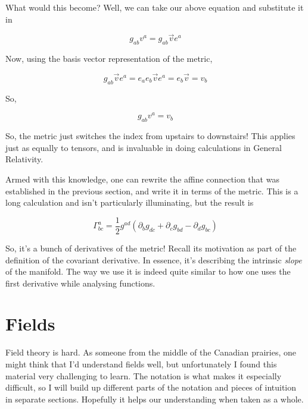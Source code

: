 \documentclass{article}
\begin{document}
What would this become? Well, we can take our above equation and substitute it in

\begin{equation}
    g_{ab} v^a = g_{ab} \vec{v} e^a
\end{equation}

Now, using the basis vector representation of the metric,

\begin{equation}
    g_{ab} \vec{v} e^a = e_a e_b \vec{v} e^a = e_b \vec{v} = v_b
\end{equation}

So,

\begin{equation}
    g_{ab} v^a = v_b
\end{equation}

So, the metric just switches the index from upstairs to downstairs! This applies just as equally to tensors, and is invaluable in doing calculations in General Relativity. 

Armed with this knowledge, one can rewrite the affine connection that was established in the previous section, and write it in terms of the metric. This is a long calculation and isn't particularly illuminating, but the result is

\begin{equation}
    \Gamma^a_{bc} = \frac{1}{2}g^{ad}(\partial_bg_{dc} + \partial_cg_{bd} - \partial_dg_{bc})
\end{equation}

So, it's a bunch of derivatives of the metric! Recall its motivation as part of the definition of the covariant derivative. In essence, it's describing the intrinsic \textit{slope} of the manifold. The way we use it is indeed quite similar to how one uses the first derivative while analysing functions. 


\section{Fields}
Field theory is hard. As someone from the middle of the Canadian prairies, one might think that I'd understand fields well, but unfortunately I found this material very challenging to learn. The notation is what makes it especially difficult, so I will build up different parts of the notation and pieces of intuition in separate sections. Hopefully it helps our understanding when taken as a whole. 
\end{document}
